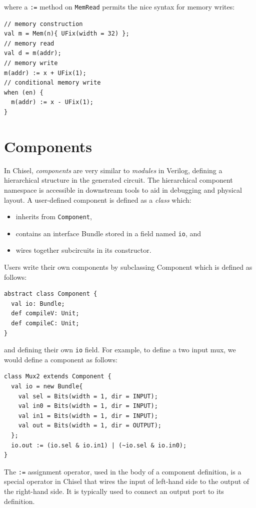\documentclass[10pt,twocolumn]{article}
\def\code#1{{\small\tt #1}}
\begin{document}
\noindent
where a \code{:=} method on \code{MemRead} permits the nice syntax for
memory writes:

\begin{lstlisting}
// memory construction
val m = Mem(n){ UFix(width = 32) };
// memory read
val d = m(addr);
// memory write
m(addr) := x + UFix(1);
// conditional memory write
when (en) {
  m(addr) := x - UFix(1);
}
\end{lstlisting}


\section{Components}

In Chisel, {\em components} are very similar to {\em modules} in
Verilog, defining a hierarchical structure in the generated circuit.
The hierarchical component namespace is accessible in downstream tools
to aid in debugging and physical layout.  A user-defined component is
defined as a {\em class} which:
\begin{itemize}
\item inherits from \code{Component},
\item contains an interface Bundle stored in a field named \code{io}, and
\item wires together subcircuits in its constructor.
\end{itemize}

Users write their own components by subclassing Component which is
defined as follows:

\begin{lstlisting}
abstract class Component {
  val io: Bundle;
  def compileV: Unit;
  def compileC: Unit;
}
\end{lstlisting}

\noindent
and defining their own \code{io} field.  For example, to define a two
input mux, we would define a component as follows:

\begin{lstlisting}
class Mux2 extends Component {
  val io = new Bundle{
    val sel = Bits(width = 1, dir = INPUT);
    val in0 = Bits(width = 1, dir = INPUT);
    val in1 = Bits(width = 1, dir = INPUT);
    val out = Bits(width = 1, dir = OUTPUT);
  };
  io.out := (io.sel & io.in1) | (~io.sel & io.in0);
}
\end{lstlisting}

\noindent
The \code{:=} assignment operator, used in the body of a
component definition, is a special operator in Chisel that wires the input of
left-hand side to the output of the right-hand side.  It is typically
used to connect an output port to its definition.
\end{document}
